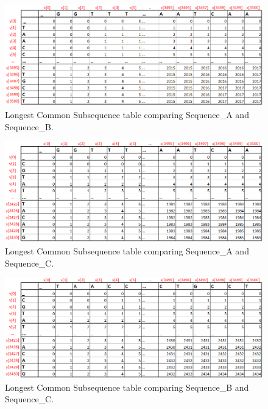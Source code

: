 \documentclass[12pt]{article}
\begin{document}
\begin{enumerate}
\begin{enumerate}
{		\begin{figure}[h!]
		\begin{center}
		\includegraphics[scale=.6]{AB_Table.png}
		\end{center}
 		\caption{Longest Common Subsequence table comparing Sequence\_A and Sequence\_B.}
		\vspace{-4mm}
		\end{figure}

		\begin{figure}[h!]
		\begin{center}
		\includegraphics[scale=.6]{AC_Table.png}
		\end{center}
 		\caption{Longest Common Subsequence table comparing Sequence\_A and Sequence\_C.}
		\vspace{1cm}
		\end{figure}

		\begin{figure}[h!]
		\begin{center}
		\includegraphics[scale=.6]{BC_Table.png}
		\end{center}
 		\caption{Longest Common Subsequence table comparing Sequence\_B and Sequence\_C.}
		\vspace{1mm}
		\end{figure}\newpage

}
\end{enumerate}
\end{enumerate}
\end{document}
